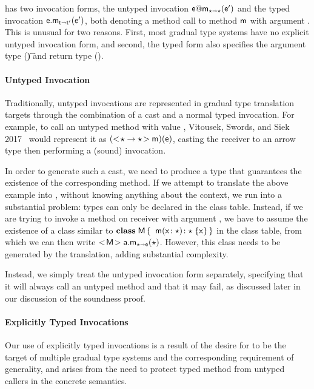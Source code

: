 \documentclass[a4paper,USenglish]{tex/lipics-v2016}
\begin{document}
\kafka has two invocation forms, the untyped invocation $\DynCall\e\m\ep$ and
the typed invocation $\KCall\e\m\ep{\t}{\tp}$, both denoting a method call to 
method ${\sf{m}}$ with argument \ep. This is unusual for two reasons. First, most
gradual type systems have no explicit untyped invocation form, and second, the
typed form also specifies the argument type (\t) and return type (\tp).

\paragraph*{Untyped Invocation}

Traditionally, untyped invocations are represented in gradual type translation
targets through the combination of a cast and a normal typed invocation. For
example, to call an untyped method \m with value \e, Vitousek, Swords, and
Siek 2017~\cite{Vitousek2017} would represent it as $(\SubCast{\any
\rightarrow\any}{\m})(\e)$, casting the receiver to an arrow type then 
performing a (sound) invocation. 

In order to generate such a cast, we need to produce a type that guarantees
the existence of the corresponding method. If we attempt to translate the
above example into \kafka, without knowing anything about the context, we run
into a substantial problem: types can only be declared in the class table.
Instead, if we are trying to invoke a method \m on receiver \a with argument
\e, we have to assume the existence of a class similar to ${\sf{\bf class}}\;{\sf{M}}\,\{\,~ { {\sf{m}}( {{\sf{x}}}\!:{\star})}\!:{\star}\;\{{{\sf{x}}}\}\,\}$ in the class table, from which we can then write
$\KCall{\SubCast{\xt M}\a}\m\any\any\e$. However, this class needs to be
generated by the translation, adding substantial complexity.

Instead, we simply treat the untyped invocation form separately, specifying
that it will always call an untyped method and that it may fail, as discussed
later in our discussion of the \kafka soundness proof.

\paragraph*{Explicitly Typed Invocations}

Our use of explicitly typed invocations is a result of the desire for \kafka
to be the target of multiple gradual type systems and the corresponding
requirement of generality, and arises from the need to protect typed method
from untyped callers in the concrete semantics.
\end{document}
